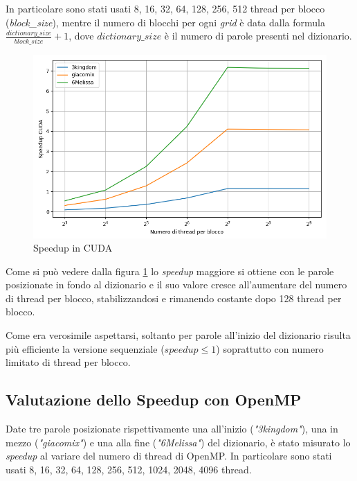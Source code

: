 \documentclass[10pt,twocolumn,letterpaper]{article}
\begin{document}
In particolare sono stati usati 8, 16, 32, 64, 128, 256, 512 thread per blocco (\textit{block\_size}), mentre il numero di blocchi per ogni \textit{grid} è data dalla formula $\frac{dictionary\_size}{block\_size}+1$, dove $dictionary\_size$ è il numero di parole presenti nel dizionario.
\begin{figure}[h]
\includegraphics[width=\linewidth]{Plots/tempi_cuda.png}
\caption{Speedup in CUDA}
\label{fig:tempi_cuda}
\end{figure}

Come si può vedere dalla figura \ref{fig:tempi_cuda} lo \textit{speedup} maggiore si ottiene con le parole posizionate in fondo al dizionario e il suo valore cresce all'aumentare del numero di thread per blocco, stabilizzandosi e rimanendo costante dopo 128 thread per blocco. 

Come era verosimile aspettarsi, soltanto per parole all'inizio del dizionario risulta più efficiente la versione sequenziale ($speedup \le 1$) soprattutto con numero limitato di thread per blocco.

\subsection{Valutazione dello Speedup con OpenMP}
Date tre parole posizionate rispettivamente una all'inizio (\textit{"3kingdom"}), una in mezzo (\textit{"giacomix"}) e una alla fine (\textit{"6Melissa"}) del dizionario, è stato misurato lo \textit{speedup} al variare del numero di thread di OpenMP. In particolare sono stati usati 8, 16, 32, 64, 128, 256, 512, 1024, 2048, 4096 thread.
\end{document}
